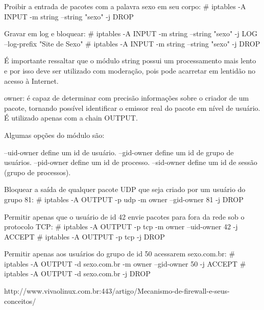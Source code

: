 Proibir a entrada de pacotes com a palavra sexo em seu corpo:
# iptables -A INPUT -m string --string "sexo" -j DROP

Gravar em log e bloquear:
# iptables -A INPUT -m string --string "sexo" -j LOG --log-prefix "Site de Sexo"
# iptables -A INPUT -m string --string "sexo" -j DROP

É importante ressaltar que o módulo string possui um processamento mais lento e por isso deve ser utilizado com moderação, pois pode acarretar em lentidão no acesso à Internet.

owner: é capaz de determinar com precisão informações sobre o criador de um pacote, tornando possível identificar o emissor real do pacote em nível de usuário. É utilizado apenas com a chain OUTPUT.

Algumas opções do módulo são:

--uid-owner define um id de usuário.
--gid-owner define um id de grupo de usuários.
--pid-owner define um id de processo.
--sid-owner define um id de sessão (grupo de processos).

Bloquear a saída de qualquer pacote UDP que seja criado por um usuário do grupo 81:
# iptables -A OUTPUT -p udp -m owner --gid-owner 81 -j DROP

Permitir apenas que o usuário de id 42 envie pacotes para fora da rede sob o protocolo TCP:
# iptables -A OUTPUT -p tcp -m owner --uid-owner 42 -j ACCEPT
# iptables -A OUTPUT -p tcp -j DROP

Permitir apenas aos usuários do grupo de id 50 acessarem sexo.com.br:
# iptables -A OUTPUT -d sexo.com.br -m owner --gid-owner 50 -j ACCEPT
# iptables -A OUTPUT -d sexo.com.br -j DROP

http://www.vivaolinux.com.br:443/artigo/Mecanismo-de-firewall-e-seus-conceitos/
